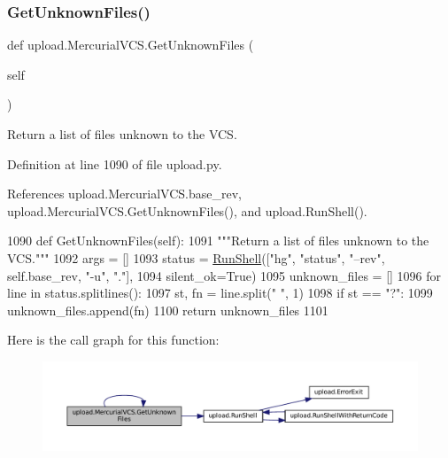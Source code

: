 \subsubsection{\texorpdfstring{Get\+Unknown\+Files()}{GetUnknownFiles()}\hspace{0.1cm}{\footnotesize\ttfamily [2/2]}}
{\footnotesize\ttfamily def upload.\+Mercurial\+V\+C\+S.\+Get\+Unknown\+Files (\begin{DoxyParamCaption}\item[{}]{self }\end{DoxyParamCaption})}

\begin{DoxyVerb}Return a list of files unknown to the VCS.\end{DoxyVerb}
 

Definition at line 1090 of file upload.\+py.



References upload.\+Mercurial\+V\+C\+S.\+base\+\_\+rev, upload.\+Mercurial\+V\+C\+S.\+Get\+Unknown\+Files(), and upload.\+Run\+Shell().


\begin{DoxyCode}
1090   \textcolor{keyword}{def }GetUnknownFiles(self):
1091     \textcolor{stringliteral}{"""Return a list of files unknown to the VCS."""}
1092     args = []
1093     status = \hyperlink{namespaceupload_adddc423c49132e8879cbb25d6be2cf11}{RunShell}([\textcolor{stringliteral}{"hg"}, \textcolor{stringliteral}{"status"}, \textcolor{stringliteral}{"--rev"}, self.base\_rev, \textcolor{stringliteral}{"-u"}, \textcolor{stringliteral}{"."}],
1094         silent\_ok=\textcolor{keyword}{True})
1095     unknown\_files = []
1096     \textcolor{keywordflow}{for} line \textcolor{keywordflow}{in} status.splitlines():
1097       st, fn = line.split(\textcolor{stringliteral}{" "}, 1)
1098       \textcolor{keywordflow}{if} st == \textcolor{stringliteral}{"?"}:
1099         unknown\_files.append(fn)
1100     \textcolor{keywordflow}{return} unknown\_files
1101 
\end{DoxyCode}
Here is the call graph for this function\+:
\nopagebreak
\begin{figure}[H]
\begin{center}
\leavevmode
\includegraphics[width=350pt]{classupload_1_1MercurialVCS_a6190899fb86cd09ad84cc5d4b0ebd2f3_cgraph}
\end{center}
\end{figure}



